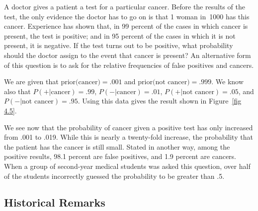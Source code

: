\begin{example}\label{exam 4.11}
A doctor gives a patient a test for a particular cancer.  Before the results of
the test, the only evidence the doctor has to go on is that 1 woman in~1000 has
this cancer.  Experience has shown that, in 99 percent of the cases in which
cancer is present, the test is positive; and in 95 percent of the cases in
which it is not present, it is negative.  If the test turns out to be positive,
what probability should the doctor assign to the event that cancer is present? 
An alternative form of this question is to ask for the relative frequencies of false 
positives and cancers.

We are given that %
$\mbox{prior(cancer)} = .001$ and
$\mbox{prior(not\ cancer)} = .999$.  We know also that $P(+| \mbox{cancer}) =
.99$, $P(-|\mbox{cancer}) = .01$, $P(+|\mbox{not\ cancer}) = .05$, and
$P(-|\mbox{not\ cancer}) = .95$.  Using this data gives the result shown in
Figure~\ref{fig 4.5}.


We see now that the probability of cancer given a positive test has only
increased from .001 to .019.  While this is nearly a twenty-fold increase, the
probability that the patient has the cancer is still small.  Stated in another way,
among the positive results, 98.1 percent are false positives, and 1.9 percent are 
cancers.  When a group of second-year medical students was asked this question, over half of the
students incorrectly guessed the probability to be greater than .5.  
\end{example}

\subsection*{Historical Remarks}

